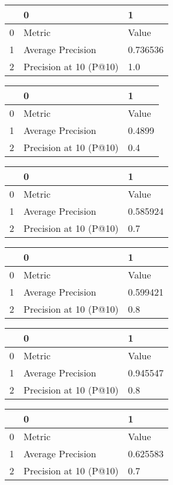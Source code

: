 \begin{tabular}{lll}
\toprule
{} &                       0 &         1 \\
\midrule
0 &                  Metric &     Value \\
1 &       Average Precision &  0.736536 \\
2 &  Precision at 10 (P@10) &       1.0 \\
\bottomrule
\end{tabular}

\begin{tabular}{lll}
\toprule
{} &                       0 &       1 \\
\midrule
0 &                  Metric &   Value \\
1 &       Average Precision &  0.4899 \\
2 &  Precision at 10 (P@10) &     0.4 \\
\bottomrule
\end{tabular}

\begin{tabular}{lll}
\toprule
{} &                       0 &         1 \\
\midrule
0 &                  Metric &     Value \\
1 &       Average Precision &  0.585924 \\
2 &  Precision at 10 (P@10) &       0.7 \\
\bottomrule
\end{tabular}

\begin{tabular}{lll}
\toprule
{} &                       0 &         1 \\
\midrule
0 &                  Metric &     Value \\
1 &       Average Precision &  0.599421 \\
2 &  Precision at 10 (P@10) &       0.8 \\
\bottomrule
\end{tabular}

\begin{tabular}{lll}
\toprule
{} &                       0 &         1 \\
\midrule
0 &                  Metric &     Value \\
1 &       Average Precision &  0.945547 \\
2 &  Precision at 10 (P@10) &       0.8 \\
\bottomrule
\end{tabular}

\begin{tabular}{lll}
\toprule
{} &                       0 &         1 \\
\midrule
0 &                  Metric &     Value \\
1 &       Average Precision &  0.625583 \\
2 &  Precision at 10 (P@10) &       0.7 \\
\bottomrule
\end{tabular}

